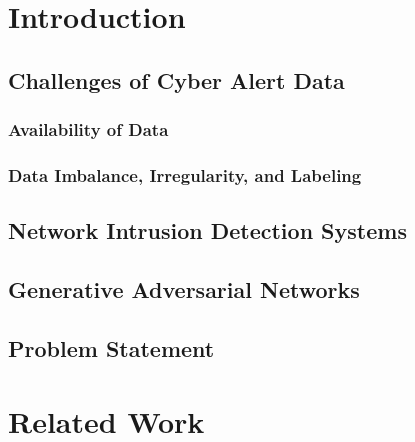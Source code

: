 \documentclass[12pt,american]{report}
\begin{document}


\afterpreface%

\printglossaries

\body%
\chapter{Introduction}

\section{Challenges of Cyber Alert Data}

\subsection{Availability of Data}

\subsection{Data Imbalance, Irregularity, and Labeling}

\section{Network Intrusion Detection Systems}

\section{Generative Adversarial Networks}

\section{Problem Statement}

\chapter{Related Work}
\end{document}
